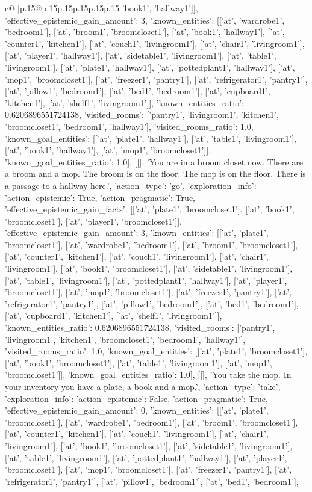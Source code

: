 \documentclass{article}
\begin{document}
{\begin{supertabular}{c@{$\;$}|p{.15\linewidth}@{}p{.15\linewidth}p{.15\linewidth}p{.15\linewidth}p{.15\linewidth}p{.15\linewidth}}
{{{'book1', 'hallway1']], 'effective_epistemic_gain_amount': 3, 'known_entities': [['at', 'wardrobe1', 'bedroom1'], ['at', 'broom1', 'broomcloset1'], ['at', 'book1', 'hallway1'], ['at', 'counter1', 'kitchen1'], ['at', 'couch1', 'livingroom1'], ['at', 'chair1', 'livingroom1'], ['at', 'player1', 'hallway1'], ['at', 'sidetable1', 'livingroom1'], ['at', 'table1', 'livingroom1'], ['at', 'plate1', 'hallway1'], ['at', 'pottedplant1', 'hallway1'], ['at', 'mop1', 'broomcloset1'], ['at', 'freezer1', 'pantry1'], ['at', 'refrigerator1', 'pantry1'], ['at', 'pillow1', 'bedroom1'], ['at', 'bed1', 'bedroom1'], ['at', 'cupboard1', 'kitchen1'], ['at', 'shelf1', 'livingroom1']], 'known_entities_ratio': 0.6206896551724138, 'visited_rooms': ['pantry1', 'livingroom1', 'kitchen1', 'broomcloset1', 'bedroom1', 'hallway1'], 'visited_rooms_ratio': 1.0, 'known_goal_entities': [['at', 'plate1', 'hallway1'], ['at', 'table1', 'livingroom1'], ['at', 'book1', 'hallway1'], ['at', 'mop1', 'broomcloset1']], 'known_goal_entities_ratio': 1.0}}], [[], 'You are in a broom closet now. There are a broom and a mop. The broom is on the floor. The mop is on the floor. There is a passage to a hallway here.', {'action_type': 'go', 'exploration_info': {'action_epistemic': True, 'action_pragmatic': True, 'effective_epistemic_gain_facts': [['at', 'plate1', 'broomcloset1'], ['at', 'book1', 'broomcloset1'], ['at', 'player1', 'broomcloset1']], 'effective_epistemic_gain_amount': 3, 'known_entities': [['at', 'plate1', 'broomcloset1'], ['at', 'wardrobe1', 'bedroom1'], ['at', 'broom1', 'broomcloset1'], ['at', 'counter1', 'kitchen1'], ['at', 'couch1', 'livingroom1'], ['at', 'chair1', 'livingroom1'], ['at', 'book1', 'broomcloset1'], ['at', 'sidetable1', 'livingroom1'], ['at', 'table1', 'livingroom1'], ['at', 'pottedplant1', 'hallway1'], ['at', 'player1', 'broomcloset1'], ['at', 'mop1', 'broomcloset1'], ['at', 'freezer1', 'pantry1'], ['at', 'refrigerator1', 'pantry1'], ['at', 'pillow1', 'bedroom1'], ['at', 'bed1', 'bedroom1'], ['at', 'cupboard1', 'kitchen1'], ['at', 'shelf1', 'livingroom1']], 'known_entities_ratio': 0.6206896551724138, 'visited_rooms': ['pantry1', 'livingroom1', 'kitchen1', 'broomcloset1', 'bedroom1', 'hallway1'], 'visited_rooms_ratio': 1.0, 'known_goal_entities': [['at', 'plate1', 'broomcloset1'], ['at', 'book1', 'broomcloset1'], ['at', 'table1', 'livingroom1'], ['at', 'mop1', 'broomcloset1']], 'known_goal_entities_ratio': 1.0}}], [[], 'You take the mop. In your inventory you have a plate, a book and a mop.', {'action_type': 'take', 'exploration_info': {'action_epistemic': False, 'action_pragmatic': True, 'effective_epistemic_gain_amount': 0, 'known_entities': [['at', 'plate1', 'broomcloset1'], ['at', 'wardrobe1', 'bedroom1'], ['at', 'broom1', 'broomcloset1'], ['at', 'counter1', 'kitchen1'], ['at', 'couch1', 'livingroom1'], ['at', 'chair1', 'livingroom1'], ['at', 'book1', 'broomcloset1'], ['at', 'sidetable1', 'livingroom1'], ['at', 'table1', 'livingroom1'], ['at', 'pottedplant1', 'hallway1'], ['at', 'player1', 'broomcloset1'], ['at', 'mop1', 'broomcloset1'], ['at', 'freezer1', 'pantry1'], ['at', 'refrigerator1', 'pantry1'], ['at', 'pillow1', 'bedroom1'], ['at', 'bed1', 'bedroom1'], }}}
\end{supertabular}}
\end{document}
